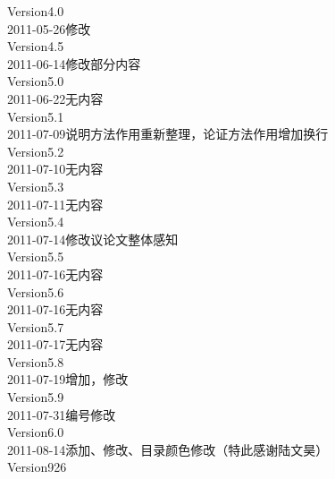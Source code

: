 Version4.0\\
2011-05-26修改\\%
Version4.5\\
2011-06-14修改部分内容\\%
Version5.0\\
2011-06-22无内容\\%
Version5.1\\
2011-07-09说明方法作用重新整理，论证方法作用增加换行\\
Version5.2\\
2011-07-10无内容\\%
Version5.3\\
2011-07-11无内容\\%
Version5.4\\
2011-07-14修改议论文整体感知\\
Version5.5\\
2011-07-16无内容\\%
Version5.6\\
2011-07-16无内容\\%
Version5.7\\
2011-07-17无内容\\%
Version5.8\\
2011-07-19增加，修改\\
Version5.9\\
2011-07-31编号修改\\
Version6.0\\
2011-08-14添加、修改、目录颜色修改（特此感谢陆文昊）\\
Version926\\
